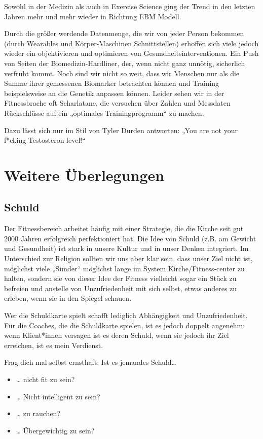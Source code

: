 \documentclass[
  letterpaper,
  DIV=11,
  numbers=noendperiod]{scrreprt}
\providecommand{\tightlist}{%
  \setlength{\itemsep}{0pt}\setlength{\parskip}{0pt}}
\begin{document}
Sowohl in der Medizin als auch in Exercise Science ging der Trend in den
letzten Jahren mehr und mehr wieder in Richtung EBM Modell.

Durch die größer werdende Datenmenge, die wir von jeder Person bekommen
(durch Wearables und Körper-Maschinen Schnittstellen) erhoffen sich
viele jedoch wieder ein objektivieren und optimieren von
Gesundheitsinterventionen. Ein Push von Seiten der Biomedizin-Hardliner,
der, wenn nicht ganz unnötig, sicherlich verfrüht kommt. Noch sind wir
nicht so weit, dass wir Menschen nur als die Summe ihrer gemessenen
Biomarker betrachten können und Training beispielsweise an die Genetik
anpassen können. Leider sehen wir in der Fitnessbrache oft Scharlatane,
die versuchen über Zahlen und Messdaten Rückschlüsse auf ein „optimales
Trainingprogramm`` zu machen.

Dazu lässt sich nur im Stil von Tyler Durden antworten: „You are not
your f*cking Testosteron level!{}``

\section{Weitere Überlegungen}\label{weitere-uxfcberlegungen}

\subsection{Schuld}\label{schuld}

Der Fitnessbereich arbeitet häufig mit einer Strategie, die die Kirche
seit gut 2000 Jahren erfolgreich perfektioniert hat. Die Idee von Schuld
(z.B. am Gewicht und Gesundheit) ist stark in unsere Kultur und in unser
Denken integriert. Im Unterschied zur Religion sollten wir uns aber klar
sein, dass unser Ziel nicht ist, möglichst viele „Sünder`` möglichst
lange im System Kirche/Fitness-center zu halten, sondern sie von dieser
Idee der Fitness vielleicht sogar ein Stück zu befreien und anstelle von
Unzufriedenheit mit sich selbst, etwas anderes zu erleben, wenn sie in
den Spiegel schauen.

Wer die Schuldkarte spielt schafft lediglich Abhängigkeit und
Unzufriedenheit. Für die Coaches, die die Schuldkarte spielen, ist es
jedoch doppelt angenehm: wenn Klient*innen versagen ist es deren Schuld,
wenn sie jedoch ihr Ziel erreichen, ist es mein Verdienst.

Frag dich mal selbst ernsthaft: Ist es jemandes Schuld\ldots{}

\begin{itemize}
\tightlist
\item
  \ldots{} nicht fit zu sein?
\item
  \ldots{} Nicht intelligent zu sein?
\item
  \ldots{} zu rauchen?
\item
  \ldots{} Übergewichtig zu sein?
\end{itemize}
\end{document}
